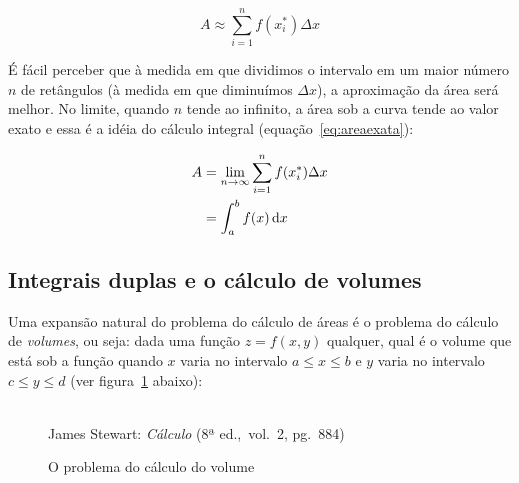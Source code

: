 \begin{equation}
  \label{eq:areaaprox}
  A \approx \sum_{i=1}^n f(x_i^*) \Delta x
\end{equation}
    
É fácil perceber que à medida em que dividimos o intervalo em um maior
número $n$ de retângulos (à medida em que diminuímos $\Delta x$), a
aproximação da área será melhor. No limite, quando $n$ tende ao
infinito, a área sob a curva tende ao valor exato e essa é a idéia do
cálculo integral (equação~\ref{eq:areaexata}):

\begin{equation}
  \label{eq:areaexata}
  \begin{split}
    A  &= \lim_{n \to \infty} \sum_{i=1}^n f(x_i^*) \Delta x\\
       &= \int_a^b f(x) \mathop{}\!\mathrm{d} x
  \end{split}
\end{equation}


\subsection{Integrais duplas e o cálculo de volumes}
\label{sec:revisao-int2}
Uma expansão natural do problema do cálculo de áreas é o problema do
cálculo de \emph{volumes}, ou seja: dada uma função $z = f(x,y)$
qualquer, qual é o volume que está sob a função quando $x$ varia no
intervalo $a \le x \le b$ e $y$ varia no intervalo $c \le y \le d$
(ver figura~\ref{fig:volume1} abaixo):

\begin{figure}[H]
  \begin{center}
    \caption{O problema do cálculo do volume}
    \label{fig:volume1}
    \\
    \footnotesize{James Stewart: \emph{Cálculo} (8ª ed.,\ vol.\ 2,
      pg.\ 884)}
  \end{center}
\end{figure}

